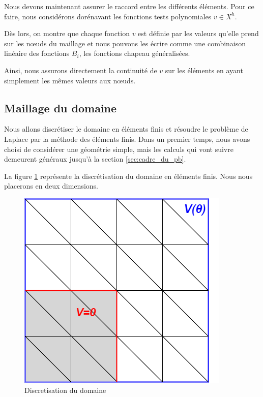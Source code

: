 \documentclass{article}
\begin{document}
Nous devons maintenant assurer le raccord entre les différents éléments.
Pour ce faire, nous considérons dorénavant les fonctions tests
polynomiales $v \in X^h$.

Dès lors, on montre que chaque fonction $v$
est définie par les valeurs qu'elle prend
sur les nœuds du maillage et nous pouvons les écrire comme une combinaison
linéaire des fonctions $B_i$, les fonctions chapeau généralisées.

Ainsi, nous assurons directement la continuité de $v$ sur les éléments en
ayant simplement les mêmes valeurs aux nœuds.

\newpage

\subsection{Maillage du domaine}
\label{sec:maillage}

\hspace{0.5cm}
Nous allons discrétiser le domaine en éléments finis et résoudre le problème
de Laplace par la méthode des éléments finis. Dans un premier temps,
nous avons choisi de considérer une géométrie simple, mais les calculs
qui vont suivre demeurent généraux jusqu'à la section \ref{sec:cadre_du_pb}.

La figure \ref{fig:pointe_ef} représente la discrétisation du domaine en éléments
finis. Nous nous placerons en deux dimensions.

\begin{figure}[h]
    \centering
    \hspace{1cm} \includegraphics[scale= 0.7]{img/pointe_ef.png}
    \caption{Discretisation du domaine}
    \label{fig:pointe_ef}
\end{figure}
\end{document}

